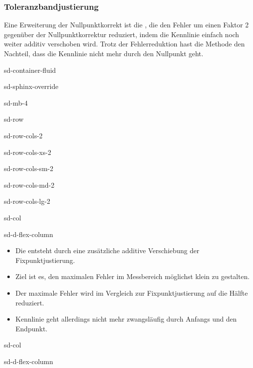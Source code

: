 \documentclass[letterpaper,10pt,english]{jupyterBook}
\begin{document}
\subsubsection{Toleranzbandjustierung}
\label{\detokenize{content/2_realeKennlinie:toleranzbandjustierung}}
\sphinxAtStartPar
Eine Erweiterung der Nullpunktkorrekt ist die , die den Fehler um einen Faktor 2 gegenüber der Nullpunktkorrektur reduziert, indem die Kennlinie einfach noch weiter additiv verschoben wird. Trotz der Fehlerreduktion hast die Methode den Nachteil, dass die Kennlinie nicht mehr durch den Nullpunkt geht.

\begin{sphinxuseclass}{sd-container-fluid}
\begin{sphinxuseclass}{sd-sphinx-override}
\begin{sphinxuseclass}{sd-mb-4}
\begin{sphinxuseclass}{sd-row}
\begin{sphinxuseclass}{sd-row-cols-2}
\begin{sphinxuseclass}{sd-row-cols-xs-2}
\begin{sphinxuseclass}{sd-row-cols-sm-2}
\begin{sphinxuseclass}{sd-row-cols-md-2}
\begin{sphinxuseclass}{sd-row-cols-lg-2}
\begin{sphinxuseclass}{sd-col}
\begin{sphinxuseclass}{sd-d-flex-column}\begin{itemize}
\item {} 
\sphinxAtStartPar
Die  entsteht durch eine zusätzliche additive Verschiebung der Fixpunktjustierung.

\item {} 
\sphinxAtStartPar
Ziel ist es, den maximalen Fehler im Messbereich möglichst klein zu gestalten.

\item {} 
\sphinxAtStartPar
Der maximale Fehler wird im Vergleich zur Fixpunktjustierung auf die Hälfte reduziert.

\item {} 
\sphinxAtStartPar
Kennlinie geht allerdings nicht mehr zwangsläufig durch Anfangs\sphinxhyphen{} und den Endpunkt.

\end{itemize}

\end{sphinxuseclass}
\end{sphinxuseclass}
\begin{sphinxuseclass}{sd-col}
\begin{sphinxuseclass}{sd-d-flex-column}
\begin{figure}[htbp]
\centering
\capstart


\end{figure}
\end{sphinxuseclass}
\end{sphinxuseclass}
\end{sphinxuseclass}
\end{sphinxuseclass}
\end{sphinxuseclass}
\end{sphinxuseclass}
\end{sphinxuseclass}
\end{sphinxuseclass}
\end{sphinxuseclass}
\end{sphinxuseclass}
\end{sphinxuseclass}
\end{document}
